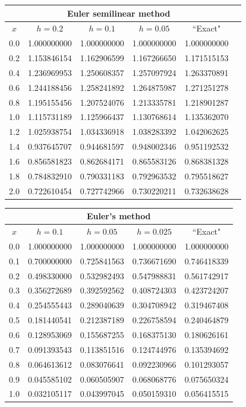 \documentclass[dvips]{book}
\renewcommand{\exer}[1]{\par\medskip\;\noindent{\color{red}\bf #1.}}
\numberwithin{example}{section}
\numberwithin{equation}{section}
\numberwithin{theorem}{section}
\numberwithin{table}{section}
\numberwithin{figure}{section}
\begin{document}
{\small
\begin{tabular}{|c|r|r|r|r|r|}
\hline
\multicolumn{5}{|c|}{Euler semilinear method}\\\hline
\multicolumn{1}{|c|}{$x$}&
\multicolumn{1}{|c|}{$h=0.2$}&
\multicolumn{1}{|c|}{$h=0.1$}&
\multicolumn{1}{|c|}{$h=0.05$}&
\multicolumn{1}{|c|}{``Exact"}\\ \hline
0.0 & 1.000000000 & 1.000000000 & 1.000000000 & 1.000000000 \\
0.2 & 1.153846154 & 1.162906599 & 1.167266650 & 1.171515153 \\
0.4 & 1.236969953 & 1.250608357 & 1.257097924 & 1.263370891 \\
0.6 & 1.244188456 & 1.258241892 & 1.264875987 & 1.271251278 \\
0.8 & 1.195155456 & 1.207524076 & 1.213335781 & 1.218901287 \\
1.0 & 1.115731189 & 1.125966437 & 1.130768614 & 1.135362070 \\
1.2 & 1.025938754 & 1.034336918 & 1.038283392 & 1.042062625 \\
1.4 & 0.937645707 & 0.944681597 & 0.948002346 & 0.951192532 \\
1.6 & 0.856581823 & 0.862684171 & 0.865583126 & 0.868381328 \\
1.8 & 0.784832910 & 0.790331183 & 0.792963532 & 0.795518627 \\
2.0 & 0.722610454 & 0.727742966 & 0.730220211 & 0.732638628 \\
\hline
\end{tabular}}

\exer{3.1.20}
{\small
\begin{tabular}{|c|r|r|r|r|}
\hline
\multicolumn{5}{|c|}{Euler's method}\\\hline
\multicolumn{1}{|c|}{$x$}&
\multicolumn{1}{|c|}{$h=0.1$}&
\multicolumn{1}{|c|}{$h=0.05$}&
\multicolumn{1}{|c|}{$h=0.025$}&
\multicolumn{1}{|c|}{``Exact"}\\ \hline
0.0 & 1.000000000 & 1.000000000 & 1.000000000 & 1.000000000 \\
0.1 & 0.700000000 & 0.725841563 & 0.736671690 & 0.746418339 \\
0.2 & 0.498330000 & 0.532982493 & 0.547988831 & 0.561742917 \\
0.3 & 0.356272689 & 0.392592562 & 0.408724303 & 0.423724207 \\
0.4 & 0.254555443 & 0.289040639 & 0.304708942 & 0.319467408 \\
0.5 & 0.181440541 & 0.212387189 & 0.226758594 & 0.240464879 \\
0.6 & 0.128953069 & 0.155687255 & 0.168375130 & 0.180626161 \\
0.7 & 0.091393543 & 0.113851516 & 0.124744976 & 0.135394692 \\
0.8 & 0.064613612 & 0.083076641 & 0.092230966 & 0.101293057 \\
0.9 & 0.045585102 & 0.060505907 & 0.068068776 & 0.075650324 \\
1.0 & 0.032105117 & 0.043997045 & 0.050159310 & 0.056415515 \\
\hline
\end{tabular}}
\medskip
\end{document}
